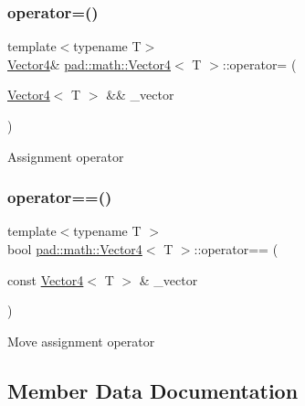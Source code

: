\mbox{\label{structpad_1_1math_1_1_vector4_aa8541807bf5c8c3a0b5edb851feb858a}} 
\subsubsection{\texorpdfstring{operator=()}{operator=()}\hspace{0.1cm}{\footnotesize\ttfamily [2/2]}}
{\footnotesize\ttfamily template$<$typename T$>$ \\
\mbox{\hyperlink{structpad_1_1math_1_1_vector4}{Vector4}}\& \mbox{\hyperlink{structpad_1_1math_1_1_vector4}{pad\+::math\+::\+Vector4}}$<$ T $>$\+::operator= (\begin{DoxyParamCaption}\item[{\mbox{\hyperlink{structpad_1_1math_1_1_vector4}{Vector4}}$<$ T $>$ \&\&}]{\+\_\+vector }\end{DoxyParamCaption})\hspace{0.3cm}{\ttfamily [default]}}

Assignment operator \mbox{\label{structpad_1_1math_1_1_vector4_afe872f9553149f12674806bb6e7eb786}} 
\subsubsection{\texorpdfstring{operator==()}{operator==()}}
{\footnotesize\ttfamily template$<$typename T $>$ \\
bool \mbox{\hyperlink{structpad_1_1math_1_1_vector4}{pad\+::math\+::\+Vector4}}$<$ T $>$\+::operator== (\begin{DoxyParamCaption}\item[{const \mbox{\hyperlink{structpad_1_1math_1_1_vector4}{Vector4}}$<$ T $>$ \&}]{\+\_\+vector }\end{DoxyParamCaption})}

Move assignment operator 

\subsection{Member Data Documentation}
\mbox{\label{structpad_1_1math_1_1_vector4_a24c818c0046fb8faabb56f64405d6cda}} 
